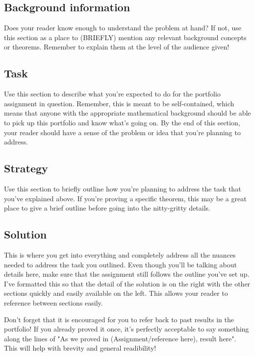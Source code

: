 \documentclass[11 pt]{article}
\begin{document}
\begin{multicols*}{2} %
    \subsection{Background information}
Does your reader know enough to understand the problem at hand? If not, use this section as a place to (BRIEFLY) mention any relevant background concepts or theorems. Remember to explain them at the level of the audience given! 

\subsection{Task}
Use this section to describe what you're expected to do for the portfolio assignment in question. Remember, this is meant to be self-contained, which means that anyone with the appropriate mathematical background should be able to pick up this portfolio and know what's going on. By the end of this section, your reader should have a sense of the problem or idea that you're planning to address.

\subsection{Strategy}
Use this section to briefly outline how you're planning to address the task that you've explained above. If you're proving a specific theorem, this may be a great place to give a brief outline before going into the nitty-gritty details. 

\columnbreak
\subsection{Solution}
This is where you get into everything and completely address all the nuances needed to address the task you outlined. Even though you'll be talking about details here, make sure that the assignment still follows the outline you've set up. I've formatted this so that the detail of the solution is on the right with the other sections quickly and easily available on the left. This allows your reader to reference between sections easily. 

Don't forget that it is encouraged for you to refer back to past results in the portfolio! If you already proved it once, it's perfectly acceptable to say something along the lines of "As we proved in (Assignment/reference here), result here". This will help with brevity and general readibility!
\end{multicols*}
\pagebreak
\end{document}
